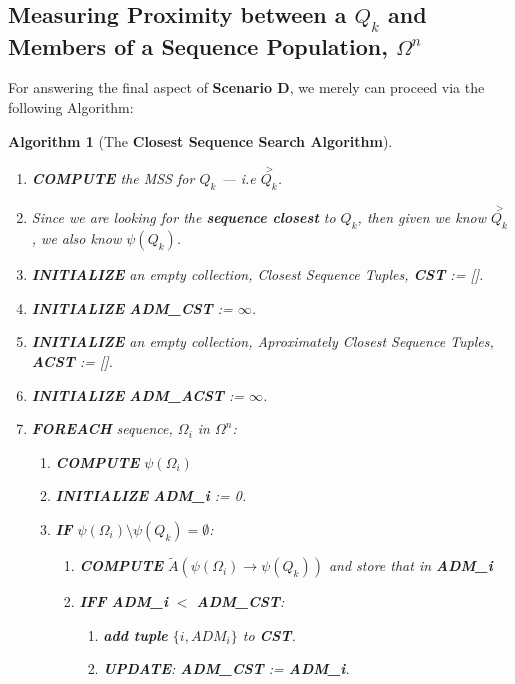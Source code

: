\documentclass[a4paper, 18pt]{book} %
\newtheorem{alg}{Algorithm}
\begin{document}
\subsection{Measuring Proximity between a $Q_k$ and Members of a Sequence Population, $\Omega^n$}
\label{SECSEQPROXSEQ}

For answering the final aspect of \textbf{Scenario D}, we merely can proceed via the following Algorithm:

\begin{alg}[The \textbf{Closest Sequence Search Algorithm}]
\label{ALGCSA}
$ $\\
\begin{enumerate}
\item \textbf{COMPUTE} the MSS for $Q_k$ --- i.e $\overset{>}{Q_k}$.
\item Since we are looking for the \textbf{sequence closest} to $Q_k$, then given we know $\overset{>}{Q_k}$, we also know $\psi(Q_k)$.
\item \textbf{INITIALIZE} an empty collection, Closest Sequence Tuples, \textbf{CST} := [].
\item \textbf{INITIALIZE} \textbf{ADM\_CST} := $\infty$.
\item \textbf{INITIALIZE}  an empty collection,  Aproximately Closest Sequence Tuples, \textbf{ACST} := [].
\item \textbf{INITIALIZE} \textbf{ADM\_ACST} := $\infty$.
\item {\textbf{FOREACH} sequence, $\Omega_i$ in $\Omega^n$: 
	\begin{enumerate}
	\item \textbf{COMPUTE} $\psi(\Omega_i)$
	\item \textbf{INITIALIZE} \textbf{ADM\_i} := 0.
	\item{\textbf{IF} $\psi(\Omega_i) \setminus \psi(Q_k) = \emptyset$: 
		\begin{enumerate}
			\item \textbf{COMPUTE} $\tilde{A}(\psi(\Omega_i) \rightarrow \psi(Q_k))$ and store that in \textbf{ADM\_i}
			\item{ \textbf{IFF} \textbf{ADM\_i} $<$ \textbf{ADM\_CST}: 
			\begin{enumerate}
			\item \textbf{add tuple} $\{i, ADM_i\}$ to \textbf{CST}.
			\item \textbf{UPDATE}: \textbf{ADM\_CST} := \textbf{ADM\_i}.
			\end{enumerate}
			
}
\end{enumerate}}
\end{enumerate}}
\end{enumerate}
\end{alg}
\end{document}
